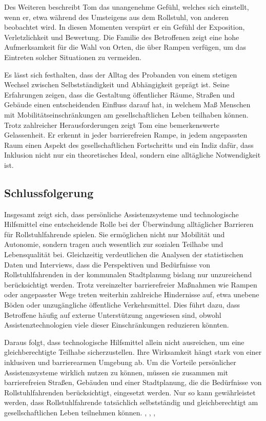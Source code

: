Des Weiteren beschreibt Tom das unangenehme Gefühl, welches sich einstellt, wenn er, etwa während des Umsteigens aus dem Rollstuhl, von anderen beobachtet wird. In diesen Momenten verspürt er ein Gefühl der Exposition, Verletzlichkeit und Bewertung. Die Familie des Betroffenen zeigt eine hohe Aufmerksamkeit 
für die Wahl von Orten, die über Rampen verfügen, um das Eintreten solcher Situationen zu vermeiden.

Es lässt sich festhalten, dass der Alltag des Probanden von einem stetigen Wechsel zwischen 
Selbstständigkeit und Abhängigkeit geprägt ist. Seine Erfahrungen zeigen, dass die Gestaltung 
öffentlicher Räume, Straßen und Gebäude einen entscheidenden Einfluss darauf hat, in welchem Maß 
Menschen mit Mobilitätseinschränkungen am gesellschaftlichen Leben teilhaben können. Trotz zahlreicher Herausforderungen zeigt Tom eine bemerkenswerte Gelassenheit. Er erkennt in jeder barrierefreien Rampe, in jedem angepassten Raum einen Aspekt des gesellschaftlichen Fortschritts und ein Indiz dafür, dass Inklusion nicht nur ein theoretisches Ideal, sondern eine alltägliche Notwendigkeit ist.
\cite{ElisaKaltenberger32026}

\subsection{Schlussfolgerung}
Insgesamt zeigt sich, dass persönliche Assistenzsysteme und technologische Hilfsmittel eine entscheidende Rolle bei der Überwindung alltäglicher Barrieren für Rollstuhlfahrende spielen. Sie ermöglichen nicht nur Mobilität und Autonomie, sondern tragen auch wesentlich zur sozialen Teilhabe und Lebensqualität bei. Gleichzeitig verdeutlichen die Analysen der statistischen Daten und Interviews, dass die Perspektiven und Bedürfnisse von Rollstuhlfahrenden in der kommunalen Stadtplanung bislang nur unzureichend berücksichtigt werden. Trotz vereinzelter barrierefreier Maßnahmen wie Rampen oder angepasster Wege treten weiterhin zahlreiche Hindernisse auf, etwa unebene Böden oder unzugängliche öffentliche Verkehrsmittel. Dies führt dazu, dass Betroffene häufig auf externe Unterstützung angewiesen sind, obwohl Assistenztechnologien viele dieser Einschränkungen reduzieren könnten.

Daraus folgt, dass technologische Hilfsmittel allein nicht ausreichen, um eine gleichberechtigte Teilhabe sicherzustellen. Ihre Wirksamkeit hängt stark von einer inklusiven und barrierearmen Umgebung ab. Um die Vorteile persönlicher Assistenzsysteme wirklich nutzen zu können, müssen sie zusammen mit barrierefreien Straßen, Gebäuden und einer Stadtplanung, die die Bedürfnisse von Rollstuhlfahrenden berücksichtigt, eingesetzt werden. Nur so kann gewährleistet werden, dass Rollstuhlfahrende tatsächlich selbstständig und gleichberechtigt am gesellschaftlichen Leben teilnehmen können.
\cite{StephanieSackl2021}, \cite{JuntangDarboe2022}, \cite{KletzmayrKerstin2022},